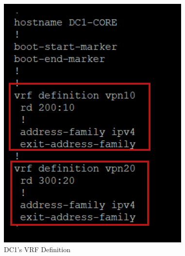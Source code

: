 \documentclass[12pt,english]{report}
\begin{document}
\begin{figure}[H]
    \begin{minipage}[b]{0.48\textwidth} %
        \centering
        \includegraphics[width=\textwidth]{chapitre 3/6.png}
        \caption{DC1's VRF Definition}
        \label{fig:DC1's VRF Definition}
    \end{minipage}
    \hfill %
    \begin{minipage}[b]{0.48\textwidth} %
        \centering

\end{minipage}
\end{figure}
\end{document}
